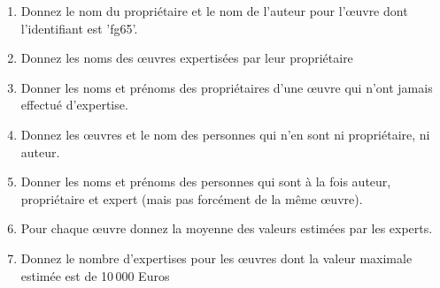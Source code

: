 \begin{enumerate}
  \item Donnez le nom du propriétaire et le nom de l'auteur pour l'{\oe}uvre dont l'identifiant est 'fg65'.

  \item Donnez les noms des {\oe}uvres expertisées par  leur propriétaire
  
\item Donner les noms et prénoms des propriétaires d'une {\oe}uvre qui n'ont jamais effectué d'expertise.

\item Donnez les {\oe}uvres et le nom des personnes qui n'en sont ni propriétaire, ni auteur.

\item Donner les noms et prénoms des personnes qui sont à la fois auteur, propriétaire et expert (mais pas forcément
     de la même {\oe}uvre). 

\item Pour chaque {\oe}uvre donnez la moyenne des valeurs estimées par les experts.

\item Donnez le nombre d'expertises pour les {\oe}uvres dont la valeur maximale estimée est de 10\,000 Euros

  
\end{enumerate}

